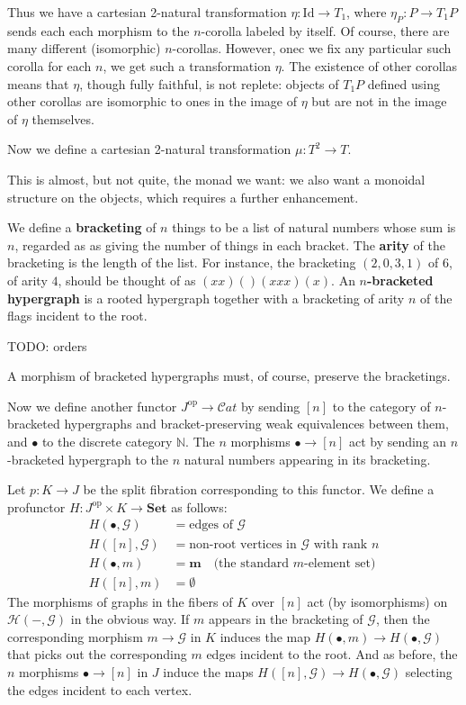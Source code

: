 \documentclass{article}
\theoremstyle{definition}
\theoremstyle{remark}
\def\G{\mathcal{G}}
\def\H{\mathcal{H}}
\def\Set{\mathbf{Set}}
\def\Cat{\ensuremath{\mathcal{C}\mathit{at}}}
\def\Id{\mathrm{Id}}
\def\op{^{\mathrm{op}}}
\def\N{\mathbb{N}}
\begin{document}
Thus we have a cartesian 2-natural transformation $\eta : \Id\to T_1$, where $\eta_P : P \to T_1 P$ sends each each morphism to the $n$-corolla labeled by itself.
Of course, there are many different (isomorphic) $n$-corollas.
However, onec we fix any particular such corolla for each $n$, we get such a transformation $\eta$.
The existence of other corollas means that $\eta$, though fully faithful, is not replete: objects of $T_1 P$ defined using other corollas are isomorphic to ones in the image of $\eta$ but are not in the image of $\eta$ themselves.

Now we define a cartesian 2-natural transformation $\mu:T^2\to T$.


\newpage

This is almost, but not quite, the monad we want: we also want a monoidal structure on the objects, which requires a further enhancement.

We define a \textbf{bracketing} of $n$ things to be a list of natural numbers whose sum is $n$, regarded as as giving the number of things in each bracket.
The \textbf{arity} of the bracketing is the length of the list.
For instance, the bracketing $(2,0,3,1)$ of $6$, of arity $4$, should be thought of as $(xx)()(xxx)(x)$.
An \textbf{$n$-bracketed hypergraph} is a rooted hypergraph together with a bracketing of arity $n$ of the flags incident to the root.




TODO: orders

A morphism of bracketed hypergraphs must, of course, preserve the bracketings.

Now we define another functor $J\op\to\Cat$ by sending $[n]$ to the category of $n$-bracketed hypergraphs and bracket-preserving weak equivalences between them, and $\bullet$ to the discrete category $\N$.
The $n$ morphisms $\bullet \to [n]$ act by sending an $n$-bracketed hypergraph to the $n$ natural numbers appearing in its bracketing.

Let $p:K \to J$ be the split fibration corresponding to this functor.
We define a profunctor $H : J\op\times K \to \Set$ as follows:
\begin{align*}
  H(\bullet,\G) &= \text{edges of $\G$}\\
  H([n],\G) &= \text{non-root vertices in $\G$ with rank $n$}\\
  H(\bullet,m) &= \mathbf{m} \quad\text{(the standard $m$-element set)}\\
  H([n],m) &= \emptyset
\end{align*}
The morphisms of graphs in the fibers of $K$ over $[n]$ act (by isomorphisms) on $\H(-,\G)$ in the obvious way.
If $m$ appears in the bracketing of $\G$, then the corresponding morphism $m\to\G$ in $K$ induces the map $H(\bullet,m) \to H(\bullet,\G)$ that picks out the corresponding $m$ edges incident to the root.
And as before, the $n$ morphisms $\bullet\to [n]$ in $J$ induce the maps $H([n],\G) \to H(\bullet,\G)$ selecting the edges incident to each vertex.
\end{document}
